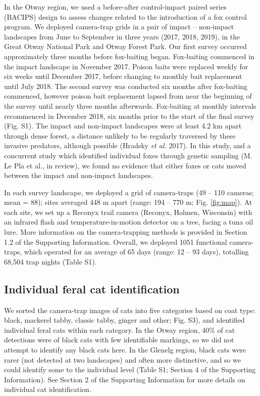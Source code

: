 \documentclass[]{elsarticle} %
\begin{document}
In the Otway region, we used a before-after control-impact paired series (BACIPS) design to assess changes related to the introduction of a fox control program. We deployed camera-trap grids in a pair of impact -- non-impact landscapes from June to September in three years (2017, 2018, 2019), in the Great Otway National Park and Otway Forest Park. Our first survey occurred approximately three months before fox-baiting began. Fox-baiting commenced in the impact landscape in November 2017. Poison baits were replaced weekly for six weeks until December 2017, before changing to monthly bait replacement until July 2018. The second survey was conducted six months after fox-baiting commenced, however poison bait replacement lapsed from near the beginning of the survey until nearly three months afterwards. Fox-baiting at monthly intervals recommenced in December 2018, six months prior to the start of the final survey (Fig. S1). The impact and non-impact landscapes were at least 4.2 km apart through dense forest, a distance unlikely to be regularly traversed by these invasive predators, although possible (Hradsky \emph{et al.} 2017). In this study, and a concurrent study which identified individual foxes through genetic sampling (M. Le Pla et al., in review), we found no evidence that either foxes or cats moved between the impact and non-impact landscapes.

In each survey landscape, we deployed a grid of camera-traps (49 -- 110 cameras; mean = 88); sites averaged 448 m apart (range: 194 -- 770 m; Fig. \ref{fig:map}). At each site, we set up a Reconyx trail camera (Reconyx, Holmen, Wisconsin) with an infrared flash and temperature-in-motion detector on a tree, facing a tuna oil lure. More information on the camera-trapping methods is provided in Section 1.2 of the Supporting Information. Overall, we deployed 1051 functional camera-traps, which operated for an average of 65 days (range: 12 -- 93 days), totalling 68,504 trap nights (Table S1).

\hypertarget{individual-feral-cat-identification}{%
\subsection{Individual feral cat identification}\label{individual-feral-cat-identification}}

We sorted the camera-trap images of cats into five categories based on coat type: black, mackerel tabby, classic tabby, ginger and other; Fig. S3), and identified individual feral cats within each category. In the Otway region, 40\% of cat detections were of black cats with few identifiable markings, so we did not attempt to identify any black cats here. In the Glenelg region, black cats were rarer (not detected at two landscapes) and often more distinctive, and so we could identify some to the individual level (Table S1; Section 4 of the Supporting Information). See Section 2 of the Supporting Information for more details on individual cat identification.
\end{document}
